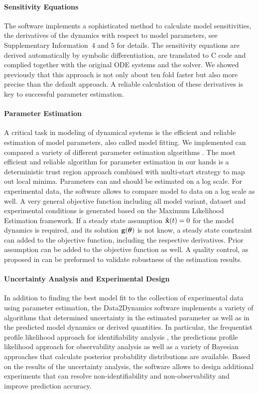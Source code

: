 \documentclass{bioinfo}
\begin{document}
\paragraph{Sensitivity Equations}
The software implements a sophisticated method to calculate model sensitivities, the derivatives of the dynamics with respect to model parameters, see Supplementary Information~4 and 5 for details. The sensitivity equations are derived automatically by symbolic differentiation, are translated to C code and complied together with the original ODE systems and the solver. We showed previously \citep{Raue:2012zt} that this approach is not only about ten fold faster but also more precise than the default approach. A reliable calculation of these derivatives is key to successful parameter estimation. 

\paragraph{Parameter Estimation}
A critical task in modeling of dynamical systems is the efficient and reliable estimation of model parameters, also called model fitting. We implemented can compared a variety of different parameter estimation algorithms \citep{Raue:2012zt}. The most efficient and reliable algorithm for parameter estimation in our hands is a deterministic trust region approach combined with multi-start strategy to map out local minima. Parameters can and should be estimated on a log scale. For experimental data, the software allows to compare model to data on a log scale as well. A very general objective function including all model variant, dataset and experimental conditions is generated based on the Maximum Likelihood Estimation framework. If a steady state assumption ${\bf \dot  x}(t) = 0$ for the model dynamics is required, and its solution ${\bf g}(\boldsymbol{\theta})$ is not know, a steady state constraint can added to the objective function, including the respective derivatives. Prior assumption can be added to the objective function as well. A quality control, as proposed in \citet{Raue:2012zt} can be preformed to validate robustness of the estimation results.

\paragraph{Uncertainty Analysis and Experimental Design}
In addition to finding the best model fit to the collection of experimental data using parameter estimation, the Data2Dynamics software implements a variety of algorithms that determined uncertainty in the estimated parameter as well as in the predicted model dynamics or derived quantities. In particular, the frequentist profile likelihood approach for identifiability analysis \citep{Raue:2009ec}, the predictions profile likelihood approach for observability analysis \citep{Kreutz:2011kx} as well as a variety of Bayesian approaches \citep{Raue:2013fk, Hug:2012fk} that calculate posterior probability distributions are available. Based on the results of the uncertainty analysis, the software allows to design additional experiments \citep{Steiert:2012fk} that can resolve non-identifiability and non-observability \citep{Raue:2010fk, Kreutz:2013uq} and improve prediction accuracy.
\end{document}

